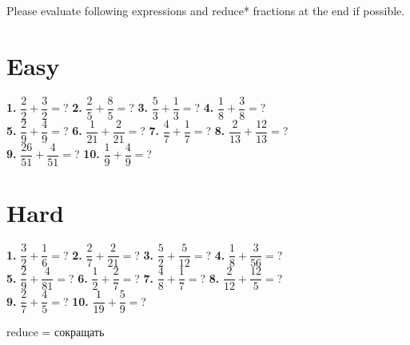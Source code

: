 \documentclass[a4paper, 12pt]{article}
\begin{document}
	{\large Please evaluate following expressions and reduce* fractions at the end if possible.}	
	
	\section* {{\Large Easy}}
	
	{\Large \textbf{1.} $\dfrac{2}{2}+\dfrac{3}{2} =$? \hspace{0.6cm}
		   \textbf{2.} $\dfrac{2}{5}+\dfrac{8}{5} =$? \hspace{0.6cm}
		   \textbf{3.} $\dfrac{5}{3}+\dfrac{1}{3} =$? \hspace{0.6cm}
		   \textbf{4.} $\dfrac{1}{8}+\dfrac{3}{8} =$? \\ [0.6cm]
		   \textbf{5.} $\dfrac{2}{9}+\dfrac{4}{9} =$? \hspace{0.6cm}
		   \textbf{6.} $\dfrac{1}{21}+\dfrac{2}{21} =$? \hspace{0.6cm}
		   \textbf{7.} $\dfrac{4}{7}+\dfrac{1}{7} =$? \hspace{0.6cm}
		   \textbf{8.} $\dfrac{2}{13}+\dfrac{12}{13} =$? \\ [0.6cm]
		   \textbf{9.} $\dfrac{26}{51}+\dfrac{4}{51} =$? \hspace{0.6cm}
		   \textbf{10.} $\dfrac{1}{9}+\dfrac{4}{9} =$?}
	
	\section* {{\Large Hard}}
	
	{\Large \textbf{1.} $\dfrac{3}{2}+\dfrac{1}{6} =$? \hspace{0.6cm}
		   \textbf{2.} $\dfrac{2}{7}+\dfrac{2}{21} =$? \hspace{0.6cm}
		   \textbf{3.} $\dfrac{5}{2}+\dfrac{5}{12} =$? \hspace{0.6cm}
		   \textbf{4.} $\dfrac{1}{8}+\dfrac{3}{56} =$? \\ [0.6cm]
		   \textbf{5.} $\dfrac{2}{9}+\dfrac{4}{81} =$? \hspace{0.6cm}
		   \textbf{6.} $\dfrac{1}{2}+\dfrac{2}{7} =$? \hspace{0.6cm}
		   \textbf{7.} $\dfrac{4}{8}+\dfrac{1}{7} =$? \hspace{0.6cm}
		   \textbf{8.} $\dfrac{2}{12}+\dfrac{12}{5} =$? \\ [0.6cm]
		   \textbf{9.} $\dfrac{2}{7}+\dfrac{4}{5} =$?  \hspace{0.6cm}
		   \textbf{10.} $\dfrac{1}{19}+\dfrac{5}{9} =$? \\ [0.6cm]}
	   
	 {\large *reduce = сокращать}
		
\end{document}
